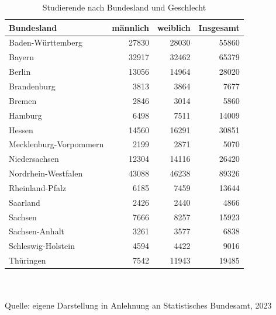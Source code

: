 \documentclass[11pt,twoside]{article}
\begin{document}
\begin{table}[H]
	\caption{Studierende nach Bundesland und Geschlecht}
	\begin{tabular}{|l|r|r|r|}
		\toprule
		\textbf{Bundesland}    & \textbf{männlich} & \textbf{weiblich} & \textbf{Insgesamt} \\
		\midrule
		Baden-Württemberg      & 27830             & 28030             & 55860              \\
		Bayern                 & 32917             & 32462             & 65379              \\
		Berlin                 & 13056             & 14964             & 28020              \\
		Brandenburg            & 3813              & 3864              & 7677               \\
		Bremen                 & 2846              & 3014              & 5860               \\
		Hamburg                & 6498              & 7511              & 14009              \\
		Hessen                 & 14560             & 16291             & 30851              \\
		Mecklenburg-Vorpommern & 2199              & 2871              & 5070               \\
		Niedersachsen          & 12304             & 14116             & 26420              \\
		Nordrhein-Westfalen    & 43088             & 46238             & 89326              \\
		Rheinland-Pfalz        & 6185              & 7459              & 13644              \\
		Saarland               & 2426              & 2440              & 4866               \\
		Sachsen                & 7666              & 8257              & 15923              \\
		Sachsen-Anhalt         & 3261              & 3577              & 6838               \\
		Schleswig-Holstein     & 4594              & 4422              & 9016               \\
		Thüringen              & 7542              & 11943             & 19485              \\
		\bottomrule
	\end{tabular}
	\footnotesize \\\\ Quelle: eigene Darstellung in Anlehnung an Statistisches Bundesamt, 2023
	\label{tab:studis}
\end{table}
\end{document}
